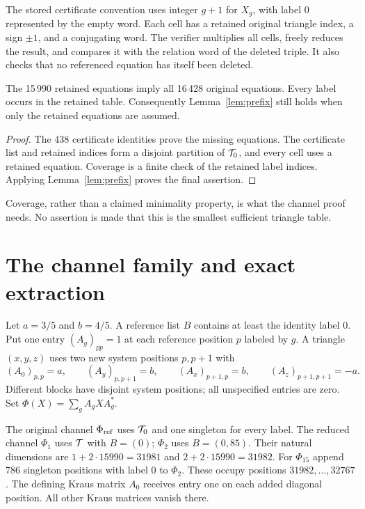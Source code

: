 The stored certificate convention uses integer $g+1$ for $X_g$, with label 0 represented
by the empty word. Each cell has a retained original triangle index, a sign $\pm1$, and a
conjugating word. The verifier multiplies all cells, freely reduces the result, and compares
it with the relation word of the deleted triple. It also checks that no referenced equation
has itself been deleted.

\begin{proposition}\label{prop:pruning}
The 15\,990 retained equations imply all 16\,428 original equations. Every label occurs in
the retained table. Consequently Lemma~\ref{lem:prefix} still holds when only the retained
equations are assumed.
\end{proposition}
\begin{proof}
The 438 certificate identities prove the missing equations. The certificate list and retained
indices form a disjoint partition of $\mathcal T_0$, and every cell uses a retained equation.
Coverage is a finite check of the retained label indices. Applying Lemma~\ref{lem:prefix}
proves the final assertion.
\end{proof}

Coverage, rather than a claimed minimality property, is what the channel proof needs. No
assertion is made that this is the smallest sufficient triangle table.

\section{The channel family and exact extraction}\label{sec:channels}

Let $a=3/5$ and $b=4/5$. A reference list $B$ contains at least the identity label 0.
Put one entry $(A_g)_{pp}=1$ at each reference position $p$ labeled by $g$. A triangle
$(x,y,z)$ uses two new system positions $p,p+1$ with
\begin{equation}
 (A_0)_{p,p}=a,\qquad (A_y)_{p,p+1}=b,\qquad
 (A_x)_{p+1,p}=b,\qquad (A_z)_{p+1,p+1}=-a.
 \label{eq:matrix-entries}
\end{equation}
Different blocks have disjoint system positions; all unspecified entries are zero.
Set $\Phi(X)=\sum_gA_gXA_g^*$.

The original channel $\Phi_{\mathrm{ref}}$ uses $\mathcal T_0$ and one singleton for every label.
The reduced channel $\Phi_1$ uses $\mathcal T$ with $B=(0)$; $\Phi_2$ uses $B=(0,85)$.
Their natural dimensions are $1+2\cdot15990=31981$ and $2+2\cdot15990=31982$.
For $\Phi_{15}$ append 786 singleton positions with label 0 to $\Phi_2$. These occupy
positions $31982,\ldots,32767$. The defining Kraus matrix $A_0$ receives entry one on
each added diagonal position. All other Kraus matrices vanish there.

